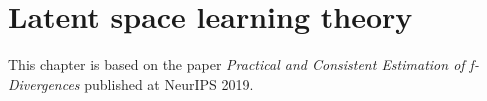 \chapter{Latent space learning theory}

\ifpdf
    \graphicspath{{Chapter6/Figs/Raster/}{Chapter6/Figs/PDF/}{Chapter6/Figs/}}
\else
    \graphicspath{{Chapter6/Figs/Vector/}{Chapter6/Figs/}}
\fi

This chapter is based on the paper \emph{Practical and Consistent Estimation of f-Divergences} published at NeurIPS 2019.
